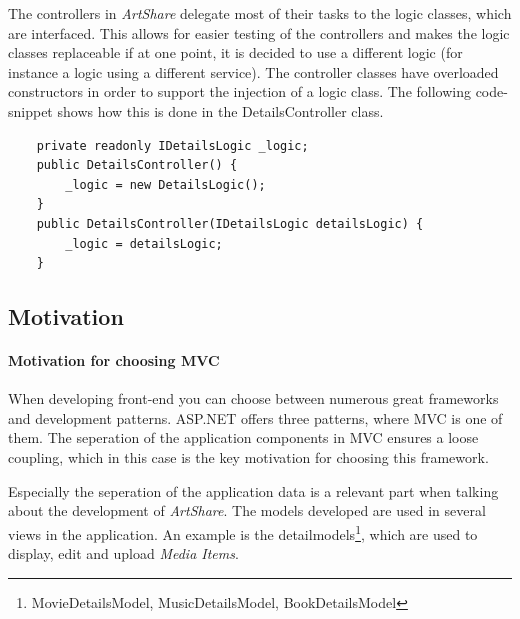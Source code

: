 \documentclass[../report.tex]{subfiles}
\begin{document}
The controllers in \textit{ArtShare} delegate most of their tasks to the logic classes, which are interfaced. This allows for easier testing of the controllers and makes the logic classes replaceable if at one point, it is decided to use a different logic (for instance a logic using a different service). The controller classes have overloaded constructors in order to support the injection of a logic class. The following code-snippet shows how this is done in the DetailsController class.

\begin{lstlisting}
	private readonly IDetailsLogic _logic;
	public DetailsController() {
		_logic = new DetailsLogic();
	}
	public DetailsController(IDetailsLogic detailsLogic) {
		_logic = detailsLogic;
	}
\end{lstlisting}




\subsection{Motivation}

\paragraph{Motivation for choosing MVC}
When developing front-end you can choose between numerous great frameworks and development patterns. ASP.NET offers three patterns, where MVC is one of them. The seperation of the application components in MVC ensures a loose coupling, which in this case is the key motivation for choosing this framework.

Especially the seperation of the application data is a relevant part when talking about the development of \textit{ArtShare}. The models developed are used in several views in the application. An example is the detailmodels\footnote{MovieDetailsModel, MusicDetailsModel, BookDetailsModel}, which are used to display, edit and upload \textit{Media Items}.
\end{document}
